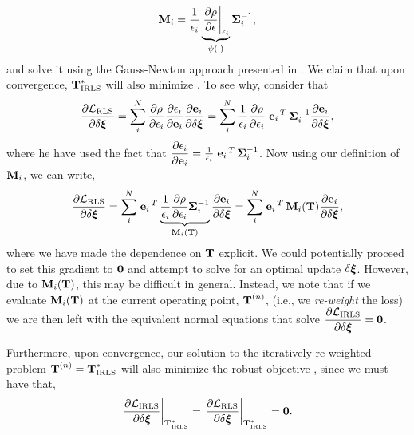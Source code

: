 \begin{equation}
	\boldsymbol{\mathbf{M}}_i = \frac{1}{\epsilon_i} \underbrace{\left.\dfrac{\partial \rho}{\partial \epsilon}\right|_{\epsilon_i}}_{\psi(\cdot)} \boldsymbol{\mathbf{\Sigma}}_{i}^{-1},
\end{equation}
and solve it using the Gauss-Newton approach presented in . We claim that upon convergence, $\boldsymbol{\mathbf{T}}^*_{\text{IRLS}}$ will also minimize . To see why, consider that
\begin{equation}
\dfrac{\partial \mathcal{L}_{\text{RLS}}}{\partial \delta \boldsymbol{\mathbf{\xi}}} = 	\sum_i^N \dfrac{\partial \rho}{\partial \epsilon_i} \dfrac{\partial \epsilon_i}{\partial \boldsymbol{\mathbf{e}}_i} \dfrac{\partial \boldsymbol{\mathbf{e}}_i}{\partial \delta \boldsymbol{\mathbf{\xi}}} = 	\sum_i^N \frac{1}{\epsilon_i} \dfrac{\partial \rho}{\partial \epsilon_i} \left.{\boldsymbol{\mathbf{e}}_{i}}\right.^T \boldsymbol{\mathbf{\Sigma}}_{i}^{-1} \dfrac{\partial \boldsymbol{\mathbf{e}}_i}{\partial \delta \boldsymbol{\mathbf{\xi}}}, 
\end{equation} where he have used the fact that $\dfrac{\partial \epsilon_i}{\partial \boldsymbol{\mathbf{e}}_i} = \frac{1}{\epsilon_i} 	\left.{\boldsymbol{\mathbf{e}}_{i}}\right.^T \boldsymbol{\mathbf{\Sigma}}_{i}^{-1}$. Now using our definition of $\boldsymbol{\mathbf{M}}_i$, we can write,
\begin{equation}
\dfrac{\partial \mathcal{L}_{\text{RLS}}}{\partial \delta \boldsymbol{\mathbf{\xi}}}  = 	\sum_i^N \left.{\boldsymbol{\mathbf{e}}_{i}}\right.^T \underbrace{\frac{1}{\epsilon_i} \dfrac{\partial \rho}{\partial \epsilon_i}  \boldsymbol{\mathbf{\Sigma}}_{i}^{-1}}_{\boldsymbol{\mathbf{M}}_i(\boldsymbol{\mathbf{T}})} \dfrac{\partial \boldsymbol{\mathbf{e}}_i}{\partial \delta \boldsymbol{\mathbf{\xi}}} = \sum_i^N \left.{\boldsymbol{\mathbf{e}}_{i}}\right.^T \boldsymbol{\mathbf{M}}_i(\boldsymbol{\mathbf{T}}) \dfrac{\partial \boldsymbol{\mathbf{e}}_i}{\partial \delta \boldsymbol{\mathbf{\xi}}}, 
\end{equation} where we have made the dependence on $\boldsymbol{\mathbf{T}}$ explicit. We could potentially proceed to set this gradient to $\boldsymbol{\mathbf{0}}$ and attempt to solve for an optimal update $\delta \boldsymbol{\mathbf{\xi}}$. However, due to $\boldsymbol{\mathbf{M}}_i(\boldsymbol{\mathbf{T}})$, this may be difficult in general.  Instead, we note that if we evaluate $\boldsymbol{\mathbf{M}}_i{(\boldsymbol{\mathbf{T}}})$ at the current operating point, $\boldsymbol{\mathbf{T}}^{(n)}$, (i.e., we \textit{re-weight} the loss) we are then left with the equivalent normal equations that solve $\dfrac{\partial \mathcal{L}_{\text{IRLS}}}{\partial \delta \boldsymbol{\mathbf{\xi}}} = \boldsymbol{\mathbf{0}}$.

Furthermore, upon convergence, our solution to the iteratively re-weighted problem $\boldsymbol{\mathbf{T}}^{(n)} = \boldsymbol{\mathbf{T}}_\text{IRLS}^*$ will also minimize the robust objective , since we must have that,
\begin{equation}
	\left.\dfrac{\partial \mathcal{L}_{\text{IRLS}}}{\partial \delta \boldsymbol{\mathbf{\xi}}}\right|_{\boldsymbol{\mathbf{T}}_\text{IRLS}^*} = \left.\dfrac{\partial \mathcal{L}_{\text{RLS}}}{\partial \delta \boldsymbol{\mathbf{\xi}}}\right|_{\boldsymbol{\mathbf{T}}_\text{IRLS}^*} = \boldsymbol{\mathbf{0}}.
\end{equation}
 




